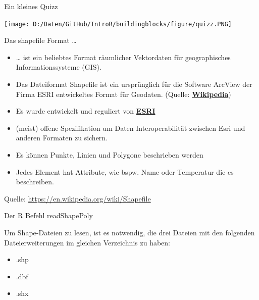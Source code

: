 \documentclass[ignorenonframetext,]{beamer}
\providecommand{\tightlist}{%
  \setlength{\itemsep}{0pt}\setlength{\parskip}{0pt}}
\begin{document}
\begin{frame}{Ein kleines Quizz}

\texttt{[image: D:/Daten/GitHub/IntroR/buildingblocks/figure/quizz.PNG]}

\end{frame}

\begin{frame}{Das shapefile Format \ldots{}}

\begin{itemize}
\item
  \ldots{} ist ein beliebtes Format räumlicher Vektordaten für
  geographisches Informationssysteme (GIS).
\item
  Das Dateiformat Shapefile ist ein ursprünglich für die Software
  ArcView der Firma ESRI entwickeltes Format für Geodaten. (Quelle:
  \href{https://de.wikipedia.org/wiki/Shapefile}{\textbf{Wikipedia}})
\item
  Es wurde entwickelt und reguliert von
  \href{http://www.esri.com/}{\textbf{ESRI}}
\item
  (meist) offene Spezifikation um Daten Interoperabilität zwischen Esri
  und anderen Formaten zu sichern.
\item
  Es können Punkte, Linien und Polygone beschrieben werden
\item
  Jedes Element hat Attribute, wie bspw. Name oder Temperatur die es
  beschreiben.
\end{itemize}

Quelle: \url{https://en.wikipedia.org/wiki/Shapefile}

\end{frame}

\begin{frame}{Der R Befehl readShapePoly}

Um Shape-Dateien zu lesen, ist es notwendig, die drei Dateien mit den
folgenden Dateierweiterungen im gleichen Verzeichnis zu haben:

\begin{itemize}
\tightlist
\item
  .shp
\item
  .dbf
\item
  .shx
\end{itemize}

\end{frame}
\end{document}
